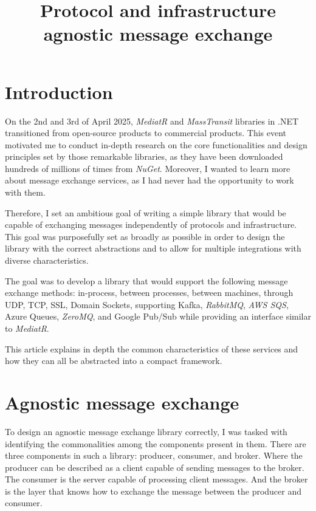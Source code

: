\documentclass[10pt, conference, a4paper]{IEEEtran}
\begin{document}
\title{Protocol and infrastructure agnostic message exchange}

\author{
}

\maketitle

\thispagestyle{plain}
\pagestyle{plain}

\section{Introduction}

On the 2nd and 3rd of April 2025, \textit{MediatR} \parencite{MediatRCommercial} and \textit{MassTransit} \parencite{MassTransitCommercial} libraries in .NET transitioned from open-source products to commercial products. 
This event motivated me to conduct in-depth research on the core functionalities and design principles set by those remarkable libraries, as they have been downloaded hundreds of millions of times from \textit{NuGet}. 
Moreover, I wanted to learn more about message exchange services, as I had never had the opportunity to work with them. 

Therefore, I set an ambitious goal of writing a simple library that would be capable of exchanging messages independently of protocols and infrastructure. 
This goal was purposefully set as broadly as possible in order to design the library with the correct abstractions and to allow for multiple integrations with diverse characteristics.

The goal was to develop a library that would support the following message exchange methods: 
in-process, between processes, between machines, through UDP, TCP, SSL, Domain Sockets, 
supporting Kafka, \textit{RabbitMQ}, \textit{AWS SQS}, Azure Queues, \textit{ZeroMQ}, and Google Pub/Sub while providing an interface similar to \textit{MediatR}. 

This article explains in depth the common characteristics of these services and how they can all be abstracted into a compact framework.

\section{Agnostic message exchange}\label{chap:MessageExchange}

To design an agnostic message exchange library correctly, I was tasked with identifying the commonalities among the components present in them. 
There are three components in such a library: producer, consumer, and broker. Where the producer can be described as a client capable of sending messages to the broker. 
The consumer is the server capable of processing client messages. And the broker is the layer that knows how to exchange the message between the producer and consumer.
\end{document}
